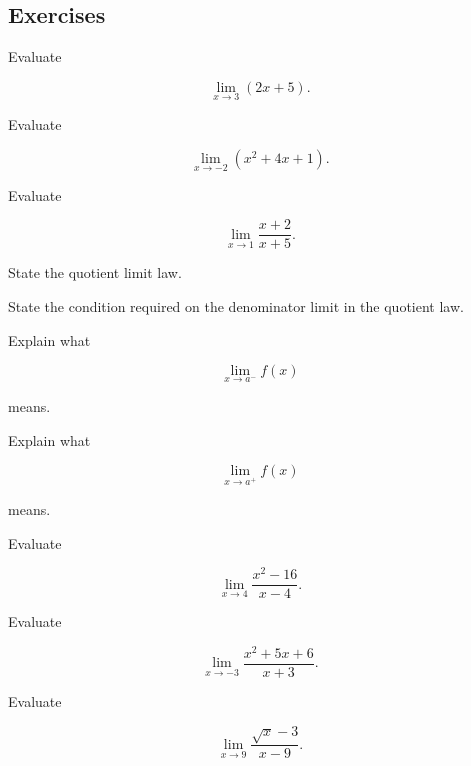 \subsection{Exercises}
\label{subsec:limit-laws-exercises}

\begin{exercise}[1]
Evaluate

\[
\lim_{x\to3}(2x+5).
\]
\end{exercise}

\begin{exercise}[1]
Evaluate

\[
\lim_{x\to-2}(x^2+4x+1).
\]
\end{exercise}

\begin{exercise}[1]
Evaluate

\[
\lim_{x\to1}
\frac{x+2}{x+5}.
\]
\end{exercise}

\begin{exercise}[1]
State the quotient limit law.
\end{exercise}

\begin{exercise}[1]
State the condition required on the denominator limit in the quotient law.
\end{exercise}

\begin{exercise}[1]
Explain what

\[
\lim_{x\to a^-}f(x)
\]

means.
\end{exercise}

\begin{exercise}[1]
Explain what

\[
\lim_{x\to a^+}f(x)
\]

means.
\end{exercise}

\begin{exercise}[2]
Evaluate

\[
\lim_{x\to4}
\frac{x^2-16}{x-4}.
\]
\end{exercise}

\begin{exercise}[2]
Evaluate

\[
\lim_{x\to-3}
\frac{x^2+5x+6}{x+3}.
\]
\end{exercise}

\begin{exercise}[2]
Evaluate

\[
\lim_{x\to9}
\frac{\sqrt{x}-3}{x-9}.
\]
\end{exercise}


